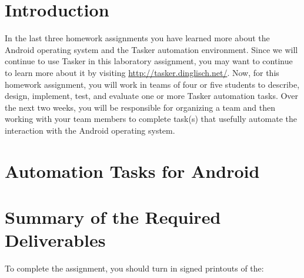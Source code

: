 

\usepackage[compact]{titlesec}



\section*{Introduction}

In the last three homework assignments you have learned more about the Android operating system and the Tasker
automation environment. Since we will continue to use Tasker in this laboratory assignment, you may want to continue to
learn more about it by visiting \url{http://tasker.dinglisch.net/}.  Now, for this homework assignment, you will work in
teams of four or five students to describe, design, implement, test, and evaluate one or more Tasker automation tasks.
Over the next two weeks, you will be responsible for organizing a team and then working with your team members to
complete task(s) that usefully automate the interaction with the Android operating system.

\section*{Automation Tasks for Android}

\section*{Summary of the Required Deliverables}

To complete the assignment, you should turn in signed printouts of the: 

